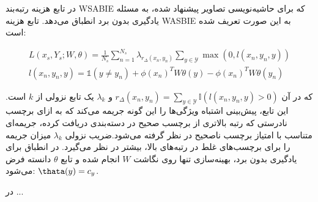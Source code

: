 در
\cite{akata2013}
 تابع هزینه رتبه‌بند WSABIE 
\cite{Weston2010}
که برای حاشیه‌نویسی تصاویر پیشنهاد شده، به مسئله یادگیری بدون برد انطباق می‌دهد. 
تابع هزینه WASBIE به این صورت تعریف شده است:

\begin{align}
L(x_s, Y_s ; W, \theta) = \frac{1}{N_s} \sum_{n=1}^{N_s} \lambda_{r_\Delta (x_n, y_n)} \sum_{y \in \mathcal{Y}} \max (0, \mathit{l}(x_n, y_n, y) ) \\
\mathit{l}(x_n,y_n,y) = \mathds{1}(y \neq y_n) + \phi(x_n)^TW \theta(y) - \phi(x_n)^TW\theta(y_n)
\end{align}

که در آن 
$ r_\Delta (x_n, y_n) =  \sum_{y \in \mathcal{Y}} \mathbb{I}(\mathit{l}(x_n, y_n, y)  > 0) $ 
 و $\lambda_k$ یک تابع نزولی از $k$ است. این تابع، پیش‌بینی اشتباه ویژگی‌ها را  این گونه جریمه می‌کند که به ازای برچسب نادرستی که رتبه بالاتری از برچسب صحیح در دسته‌بندی دریافت کرده، جریمه‌ای متناسب با امتیاز برچسب ناصحیح در نظر گرفته می‌شود.ضریب نزولی $\lambda_k$ میزان جریمه را برای برچسب‌های غلط در رتبه‌های بالا، بیشتر در نظر می‌گیرد. در انطباق برای یادگیری بدون برد، بهینه‌سازی تنها روی نگاشت $W$ انجام شده و  تابع $\theta$ دانسته فرض می‌شود: 
$\thata(y) = c_y$.


در \cite{SJE} ...


